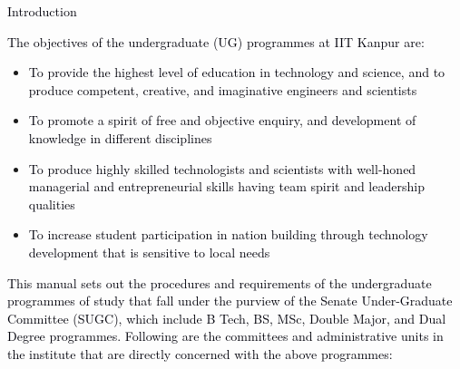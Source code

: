 \documentclass[12pt]{article}
\begin{document}
\vspace{\baselineskip}
{\fontsize{20pt}{24.0pt}\selectfont \textcolor[HTML]{00000A}{Introduction}\par}\par


\vspace{\baselineskip}
{\fontsize{10pt}{12.0pt}\selectfont \textcolor[HTML]{00000A}{The objectives of the undergraduate (UG) programmes at IIT Kanpur are:}\par}\par


\vspace{\baselineskip}
\begin{itemize}
	\item {\fontsize{10pt}{12.0pt}\selectfont \textcolor[HTML]{00000A}{To provide the highest level of education in technology and science, and to produce competent, creative, and imaginative engineers and scientists}\par}\par


\vspace{\baselineskip}
	\item {\fontsize{10pt}{12.0pt}\selectfont \textcolor[HTML]{00000A}{To promote a spirit of free and objective enquiry, and development of knowledge in different disciplines}\par}\par


\vspace{\baselineskip}
	\item {\fontsize{10pt}{12.0pt}\selectfont \textcolor[HTML]{00000A}{To produce highly skilled technologists and scientists with well-honed managerial and entrepreneurial skills having team spirit and leadership qualities}\par}\par


\vspace{\baselineskip}
	\item {\fontsize{9pt}{10.8pt}\selectfont \textcolor[HTML]{00000A}{To increase student participation in nation building through technology development that is sensitive to local needs}\par}
\end{itemize}\par


\vspace{\baselineskip}
\begin{justify}
{\fontsize{10pt}{12.0pt}\selectfont \textcolor[HTML]{00000A}{This manual sets out the procedures and requirements of the undergraduate programmes of study that fall under the purview of the Senate Under-Graduate Committee (SUGC), which include B Tech, BS, MSc, Double Major, and Dual Degree programmes. Following are the committees and administrative units in the institute that are directly concerned with the above programmes:}\par}
\end{justify}\par
\end{document}

